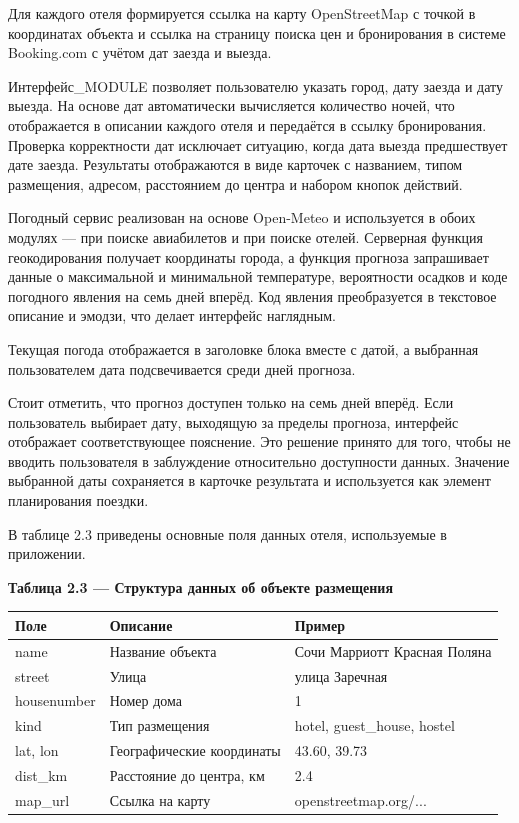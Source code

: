 \documentclass[14pt,a4paper,oneside]{extreport}
\begin{document}
Для каждого отеля формируется ссылка на карту OpenStreetMap с точкой в координатах объекта и ссылка на страницу поиска цен и бронирования в системе Booking.com с учётом дат заезда и выезда.

Интерфейс\_MODULE позволяет пользователю указать город, дату заезда и дату выезда. На основе дат автоматически вычисляется количество ночей, что отображается в описании каждого отеля и передаётся в ссылку бронирования. Проверка корректности дат исключает ситуацию, когда дата выезда предшествует дате заезда. Результаты отображаются в виде карточек с названием, типом размещения, адресом, расстоянием до центра и набором кнопок действий.

Погодный сервис реализован на основе Open-Meteo и используется в обоих модулях — при поиске авиабилетов и при поиске отелей. Серверная функция геокодирования получает координаты города, а функция прогноза запрашивает данные о максимальной и минимальной температуре, вероятности осадков и коде погодного явления на семь дней вперёд. Код явления преобразуется в текстовое описание и эмодзи, что делает интерфейс наглядным.

Текущая погода отображается в заголовке блока вместе с датой, а выбранная пользователем дата подсвечивается среди дней прогноза.

Стоит отметить, что прогноз доступен только на семь дней вперёд. Если пользователь выбирает дату, выходящую за пределы прогноза, интерфейс отображает соответствующее пояснение. Это решение принято для того, чтобы не вводить пользователя в заблуждение относительно доступности данных. Значение выбранной даты сохраняется в карточке результата и используется как элемент планирования поездки.

В таблице 2.3 приведены основные поля данных отеля, используемые в приложении.

\begin{table}[htbp]\centering

\textbf{Таблица 2.3 — Структура данных об объекте размещения}\par\vspace{4pt}

\begin{center}
\small
\begin{tabularx}{\textwidth}{|X|X|X|}
\hline
Поле & Описание & Пример \\
\hline
name & Название объекта & Сочи Марриотт Красная Поляна \\
\hline
street & Улица & улица Заречная \\
\hline
housenumber & Номер дома & 1 \\
\hline
kind & Тип размещения & hotel, guest\_house, hostel \\
\hline
lat, lon & Географические координаты & 43.60, 39.73 \\
\hline
dist\_km & Расстояние до центра, км & 2.4 \\
\hline
map\_url & Ссылка на карту & openstreetmap.org/... \\
\hline
\end{tabularx}
\end{center}

\end{table}
\end{document}
